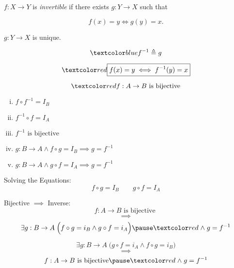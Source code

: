 \begin{frame}{}
  \begin{definition}[Invertible]
    $f: X \to Y$ is {\it invertible} if there exists $g: Y \to X$ such that

    \[
      f(x) = y \iff g(y) = x.
    \]
  \end{definition}

  \pause
  \vspace{0.30cm}
  \begin{theorem}
    $g: Y \to X$ is unique.
  \end{theorem}

  \pause
  \[
    \blue{f^{-1} \triangleq g}
  \]

  \pause
  \[
    \red{\boxed{f(x) = y \iff f^{-1}(y) = x}}
  \]
\end{frame}

\begin{frame}{}
  \begin{theorem}[UD Theorem 16.4]
    \[
      \red{f: A \to B \text{ is bijective}}
    \]

    \begin{enumerate}[(i)]
      \item $f \circ f^{-1} = I_B$
      \item $f^{-1} \circ f = I_A$
      \vspace{0.30cm}
      \item $f^{-1} \text{ is bijective}$
      \vspace{0.30cm}
      \item $g: B \to A \land f \circ g = I_B \implies g = f^{-1}$
      \item $g: B \to A \land g \circ f = I_A \implies g = f^{-1}$
    \end{enumerate}
  \end{theorem}

  \pause
  \vspace{0.30cm}
  \begin{alertblock}{Solving the Equations:}
    \[
      f \circ g = I_B \qquad g \circ f = I_A
    \]
  \end{alertblock}
\end{frame}

\begin{frame}{}
  \begin{alertblock}{Bijective $\implies$ Inverse:}
    \[
      f: A \to B \text{ is bijective }
    \]
    \[ 
      \implies 
    \]
    \[
      \exists g: B \to A\; \Big( f \circ g = i_B \land g \circ f = i_A \Big) \pause \red{\;\land\; g = f^{-1}}
    \]
  \end{alertblock}

  \pause
  \vspace{0.50cm}
  \begin{theorem}
    \[
      \exists g: B \to A\; \Big( g \circ f = i_A \land f \circ g = i_B \Big) 
    \]
    \[ 
      \implies 
    \]
    \[
      f: A \to B \text{ is bijective} \pause \red{\;\land\; g = f^{-1}}
    \]
  \end{theorem}
\end{frame}

